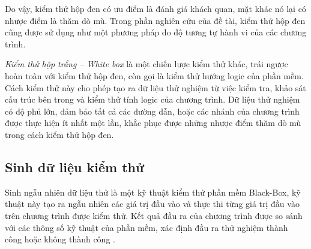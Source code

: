 Do vậy, kiểm thử hộp đen có ưu điểm là đánh giá khách quan, mặt khác
nó lại có nhược điểm là thăm dò mù. Trong phần nghiên cứu của đề tài,
kiểm thử hộp đen cũng được sử dụng như một phương pháp đo độ tương tự
hành vi của các chương trình.
		
\emph{Kiểm thử hộp trắng – White box} là một chiến lược kiểm thử khác,
trái ngược hoàn toàn với kiểm thử hộp đen, còn gọi là kiểm thử hướng
logic của phần mềm. Cách kiểm thử này cho phép tạo ra dữ liệu thử
nghiệm từ việc kiểm tra, khảo sát cấu trúc bên trong và kiểm thử tính
logic của chương trình. Dữ liệu thử nghiệm có độ phủ lớn, đảm bảo tất
cả các đường dẫn, hoặc các nhánh của chương trình được thực hiện ít
nhất một lần, khắc phục được những nhược điểm thăm dò mù trong cách
kiểm thử hộp đen.
			
	

\subsection{Sinh dữ liệu kiểm thử}

Sinh ngẫu nhiên dữ liệu thử là một kỹ thuật kiểm thử phần mềm Black-Box, kỹ thuật này tạo ra ngẫu nhiên các giá trị đầu vào và thực thi từng giá trị đầu vào trên chương trình được kiểm thử. Kết quả đầu ra của chương trình được so sánh với các thông số kỹ thuật của phần mềm, xác định đầu ra thử nghiệm thành công hoặc không thành công \cite{myers2011art}.  

